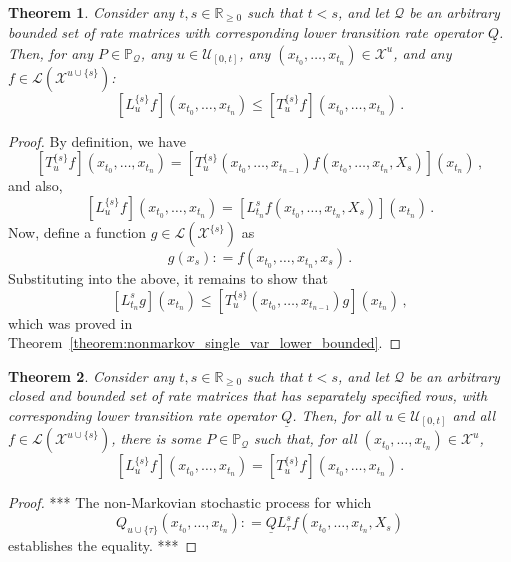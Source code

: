 \documentclass[a4paper,reqno]{amsart}
\newtheorem{theorem}{Theorem}
\newcommand{\reals}{\mathbb{R}}
\newcommand{\realsnonneg}{\reals_{\geq 0}}
\newcommand{\states}{\mathcal{X}}
\newcommand{\gambles}{\mathcal{L}}
\newcommand{\lrate}{\underline{Q}}
\newcommand{\coloneqq}{:\!=}
\begin{document}
\begin{theorem}\label{theorem:nonmarkov_historic_variable_lower_bounded}
Consider any $t,s\in\realsnonneg$ such that $t<s$, and let $\mathcal{Q}$ be an arbitrary bounded set of rate matrices with corresponding lower transition rate operator $\lrate$. Then, for any $P\in\mathbb{P}_\mathcal{Q}$, any $u\in\mathcal{U}_{[0,t]}$, any $(x_{t_0},\ldots,x_{t_n})\in\states^u$, and any $f\in\gambles(\states^{u\cup\{s\}})$:
\begin{equation*}
\left[L_u^{\{s\}}f\right](x_{t_0},\ldots,x_{t_n}) \leq \left[T_u^{\{s\}}f\right](x_{t_0},\ldots,x_{t_n})\,.
\end{equation*}
\end{theorem}
\begin{proof}
By definition, we have
\begin{equation*}
\left[T_u^{\{s\}}f\right](x_{t_0},\ldots,x_{t_n}) = \left[T_u^{\{s\}}(x_{t_0},\ldots,x_{t_{n-1}})f(x_{t_0},\ldots,x_{t_n},X_s)\right](x_{t_n})\,,
\end{equation*}
and also,
\begin{equation*}
\left[L_u^{\{s\}}f\right](x_{t_0},\ldots,x_{t_n}) = \left[L_{t_n}^s f(x_{t_0},\ldots,x_{t_{n}},X_s)\right](x_{t_n})\,.
\end{equation*}
Now, define a function $g\in\gambles(\states^{\{s\}})$ as
\begin{equation*}
g(x_s) \coloneqq f(x_{t_0},\ldots,x_{t_n},x_s)\,.
\end{equation*}
Substituting into the above, it remains to show that
\begin{equation*}
\left[L_{t_n}^s g\right](x_{t_n}) \leq \left[T_u^{\{s\}}(x_{t_0},\ldots,x_{t_{n-1}})g\right](x_{t_n})\,,
\end{equation*}
which was proved in Theorem~\ref{theorem:nonmarkov_single_var_lower_bounded}.
\end{proof}

\begin{theorem}\label{theorem:nonmarkov_historic_variable_lower_envelope}
Consider any $t,s\in\realsnonneg$ such that $t<s$, and let $\mathcal{Q}$ be an arbitrary closed and bounded set of rate matrices that has separately specified rows, with corresponding lower transition rate operator $\lrate$. Then, for all $u\in\mathcal{U}_{[0,t]}$ and all $f\in\gambles(\states^{u\cup\{s\}})$, there is some $P\in\mathbb{P}_\mathcal{Q}$ such that, for all $(x_{t_0},\ldots,x_{t_n})\in\states^u$,
\begin{equation*}
\left[L_{u}^{\{s\}}f\right](x_{t_0},\ldots,x_{t_n}) = \left[T_{u}^{\{s\}}f\right](x_{t_0},\ldots,x_{t_n})\,.
\end{equation*}
\end{theorem}
\begin{proof}
*** The non-Markovian stochastic process for which 
\begin{equation*}
Q_{u\cup\{\tau\}}(x_{t_0},\ldots,x_{t_{n}})\coloneqq \lrate L_{\tau}^sf(x_{t_0},\ldots,x_{t_n},X_s)
\end{equation*}
establishes the equality. ***
\end{proof}
\end{document}
